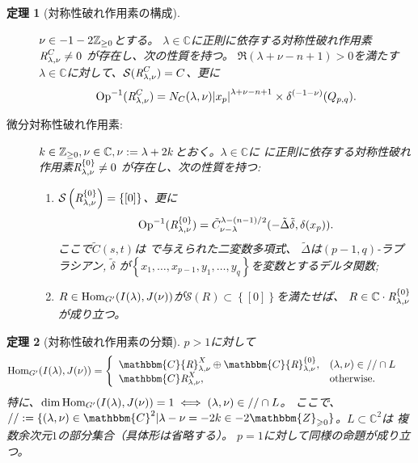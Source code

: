 \documentclass[12pt]{msjproc} %
\newcommand{\assign}{:=}
\newtheorem{theorem}{定理}
\newcommand{\Hom}{\mbox{\normalfont Hom}}
\newcommand{\Op}{\mbox{\normalfont Op}}
\newcommand{\OpR}{\mbox{\it R}}
\begin{document}
\begin{theorem}[対称性破れ作用素の構成]
\begin{description}
				$\nu\in-1-2\mathbb{Z}_{\ge0}$とする。
				$\lambda\in \mathbb{C}$に正則に依存する対称性破れ作用素$\OpR^{C}_{\lambda,\nu}\neq0$
				が存在し、次の性質を持つ。
				 $\Re(\lambda+\nu-n+1)>0$を満たす$\lambda\in\mathbb{C}$に対して、$\mathcal{S}(\OpR^{C}_{\lambda,\nu})=C$、更に
					 \[\Op^{-1}(\OpR^{C}_{\lambda,\nu})={N_C
						(\lambda,\nu)}{\myabs{x_p}^{\lambda+\nu-n+1}\times\delta^{(-1-\nu)}(Q_{p,q}) }
					.\]
			\item[微分対称性破れ作用素:] 
				{$k\in\mathbb{Z}_{\ge0},\nu\in\mathbb{C},\nu:=\lambda+2k$とおく。$\lambda\in\mathbb{C}$に}
				に正則に依存する対称性破れ作用素$\OpR^{ \left\{ 0 \right\} }_{\lambda,\nu}\neq0$
				が存在し、次の性質を持つ:
				\begin{enumerate}
					\item $\mathcal{S}\left(\OpR^{ \left\{ 0 \right\} }_{\lambda,\nu}  \right)=\left\{ [0] \right\}$、更に
		\[\Op^{-1}(\OpR^{ \left\{0\right\}}_{\lambda,\nu})=\tilde{C}_{\nu-\lambda}^{\lambda-(n-1)/2}(-\tilde{\Delta}\tilde{\delta},\delta(x_p)).
				\]
				ここで$\tilde{C}(s,t)$は \cite[(16.3)]{kobayashi2015symmetry}で与えられた二変数多項式、
				$\tilde{\Delta}$は$(p - 1, q)$-ラプラシアン, $\tilde{\delta}$ が$\left\{ x_1,\dots,x_{p-1},y_1,\dots,y_q \right\}$を変数とするデルタ関数;
					\item
				$R\in\Hom_{G'}(I(\lambda),J(\nu))$が$\mathcal{S}(R)\subset\left\{ [0] \right\}$を満たせば、
				$R\in\mathbb{C}\cdot\OpR^{ \left\{0\right\}}_{\lambda,\nu}$が成り立つ。
				\end{enumerate}
	\end{description}
\end{theorem}
\begin{theorem}[対称性破れ作用素の分類]
  $p > 1$に対して
  \begin{eqnarray}
	  & \Hom_{G'}(I(\lambda),J(\nu))= \left\{
    \begin{array}{ll}
      \mathbbm{C} {\OpR}_{\lambda, \nu}^{X} \oplus \mathbbm{C}
      {\OpR}^{\{ 0 \}}_{\lambda, \nu}, & (\lambda, \nu) \in / /\cap 
      L\\
      \mathbbm{C} \OpR^X_{\lambda, \nu}, &
      \mbox{\normalfont otherwise.}
    \end{array} \right. &  \nonumber
  \end{eqnarray}
  特に、$\dim\Hom_{G'}(I(\lambda),J(\nu))=1\iff(\lambda,\nu)\in//\cap L$。
  ここで、$//\assign \{ (\lambda, \nu) \in \mathbbm{C}^2 |
  \lambda - \nu = - 2 k \in - 2\mathbbm{Z}_{\geqslant 0} \}$。$L\subset\mathbb{C}^2$は
  複数余次元$1$の部分集合（具体形は省略する）。
  $p=1$に対して同様の命題が成り立つ。
\end{theorem}
\end{document}
